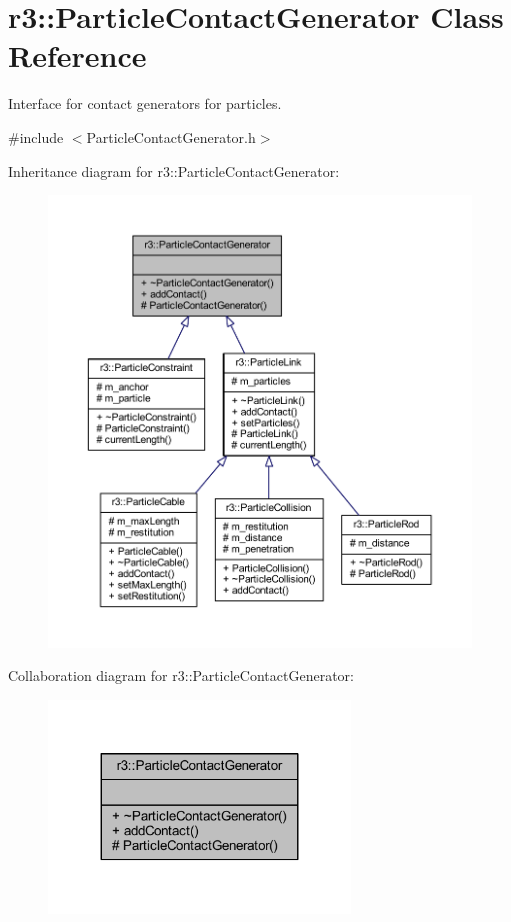 \hypertarget{classr3_1_1_particle_contact_generator}{}\section{r3\+:\+:Particle\+Contact\+Generator Class Reference}
\label{classr3_1_1_particle_contact_generator}


Interface for contact generators for particles.  




{\ttfamily \#include $<$Particle\+Contact\+Generator.\+h$>$}



Inheritance diagram for r3\+:\+:Particle\+Contact\+Generator\+:\nopagebreak
\begin{figure}[H]
\begin{center}
\leavevmode
\includegraphics[width=350pt]{classr3_1_1_particle_contact_generator__inherit__graph}
\end{center}
\end{figure}


Collaboration diagram for r3\+:\+:Particle\+Contact\+Generator\+:\nopagebreak
\begin{figure}[H]
\begin{center}
\leavevmode
\includegraphics[width=227pt]{classr3_1_1_particle_contact_generator__coll__graph}
\end{center}
\end{figure}
